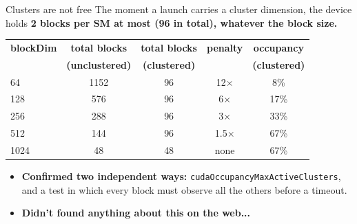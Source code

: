 \documentclass[aspectratio=169, numbering=fraction]{beamer}
\begin{document}
\begin{frame}{Clusters are not free}
  \vspace{0.5em}
  \footnotesize
  The moment a launch carries a cluster dimension, the device holds \textbf{2 blocks
  per SM at most (96 in total), whatever the block size.}

  \vspace{0.5em}
  \centering
  \begin{tabular}{lcccc}
    \toprule
    \textbf{blockDim} & \textbf{total blocks} & \textbf{total blocks} & \textbf{penalty} & \textbf{occupancy} \\
     & \textbf{(unclustered)} & \textbf{(clustered)} & & \textbf{(clustered)} \\
    \midrule
    64   & 1152 & 96 & 12$\times$ & 8\% \\
    128  & 576  & 96 & 6$\times$           & 17\% \\
    256  & 288  & 96 & 3$\times$           & 33\% \\
    512  & 144  & 96 & 1.5$\times$         & 67\% \\
    1024 & 48   & 48 & none                & 67\% \\
    \bottomrule
  \end{tabular}

  \vspace{0.6em}
  \raggedright
  \begin{itemize}\itemsep1pt
    \item \textbf{Confirmed two independent ways:} \texttt{cudaOccupancyMaxActiveClusters}, and a test in which every block must observe all the others before a timeout.
    \item \textbf{Didn't found anything about this on the web...}
  \end{itemize}

\end{frame}
\end{document}
